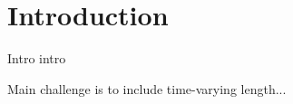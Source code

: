 \section{Introduction}\label{sec:introduction}
Intro intro

Main challenge is to include time-varying length...